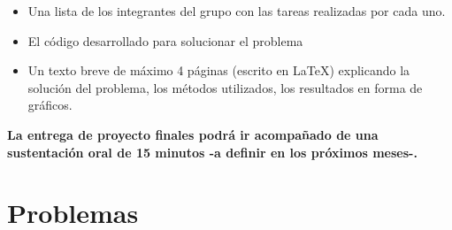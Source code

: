\documentclass[10.5pt]{article}
\begin{document}
\begin{itemize}
\item Una lista de los integrantes del grupo con las tareas realizadas por cada uno.
\item El código desarrollado para solucionar el problema
\item Un texto breve de máximo 4 páginas (escrito en \LaTeX) explicando la solución del problema, los métodos utilizados, los resultados en forma de gráficos.
\end{itemize}

{\bf La entrega de proyecto finales podrá ir acompañado de una sustentación oral de 15 minutos -a definir en los próximos meses-.}

\section{Problemas}
\end{document}
